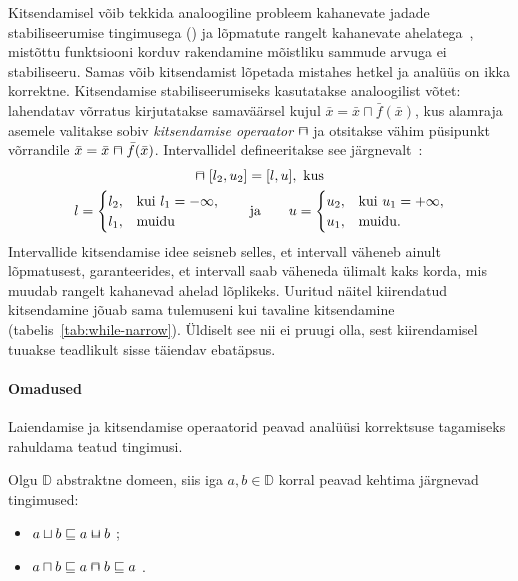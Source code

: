 \documentclass[../thesis.tex]{subfiles}
\begin{document}
Kitsendamisel võib tekkida analoogiline probleem kahanevate jadade stabiliseerumise tingimusega () ja lõpmatute rangelt kahanevate ahelatega~\cite[65]{seidl_foundations}, mistõttu funktsiooni korduv rakendamine mõistliku sammude arvuga ei stabiliseeru. Samas võib kitsendamist lõpetada mistahes hetkel ja analüüs on ikka korrektne. Kitsendamise stabiliseerumiseks kasutatakse analoogilist võtet: lahendatav võrratus kirjutatakse samaväärsel kujul $\bar{x} = \bar{x} \sqcap \bar{f}(\bar{x})$, kus alamraja asemele valitakse sobiv \emph{kitsendamise operaator} $\narrow$ ja otsitakse vähim püsipunkt võrrandile $\bar{x} = \bar{x} \narrow \bar{f}(\bar{x})$. Intervallidel defineeritakse see järgnevalt~\cite[66]{seidl_foundations}:
\begin{gather*}
	[l_1, u_1] \narrow [l_2, u_2] = [l, u], \text{ kus} \\
	l = \begin{cases}
		l_2, & \text{kui } l_1 = -\infty, \\
		l_1, & \text{muidu}
	\end{cases}
	\qquad \text{ja} \qquad
	u = \begin{cases}
		u_2, & \text{kui } u_1 = +\infty, \\
		u_1, & \text{muidu}.
	\end{cases}
\end{gather*}
Intervallide kitsendamise idee seisneb selles, et intervall väheneb ainult lõpmatusest, garanteerides, et intervall saab väheneda ülimalt kaks korda, mis muudab rangelt kahanevad ahelad lõplikeks. Uuritud näitel kiirendatud kitsendamine jõuab sama tulemuseni kui tavaline kitsendamine (tabelis~\ref{tab:while-narrow}). Üldiselt see nii ei pruugi olla, sest kiirendamisel tuuakse teadlikult sisse täiendav ebatäpsus.

\paragraph{Omadused}
Laiendamise ja kitsendamise operaatorid peavad analüüsi korrektsuse tagamiseks rahuldama teatud tingimusi.

\noindent
Olgu $\mathbb{D}$ abstraktne domeen, siis iga $a, b \in \mathbb{D}$ korral peavad kehtima järgnevad tingimused:
\begin{itemize}[nosep]
	\item $a \sqcup b \sqleq a \widen b$ \cite[61]{seidl_foundations};
	\item $a \sqcap b \sqleq a \narrow b \sqleq a$ \cite[66]{seidl_foundations}.
\end{itemize}
\end{document}
